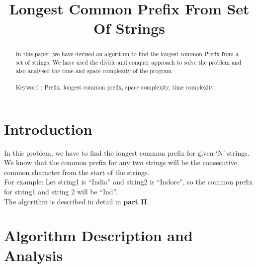 \documentclass[conference]{IEEEtran}
\begin{document}
\title{
Longest Common Prefix From Set Of Strings\\
}

\author{
\and
{}
\and
{}
}

\maketitle

\noindent \begin{abstract}

In this paper ,we have devised an algorithm to find the longest common Prefix from a set of strings. We have used the divide and conquer approach to solve the problem and also analysed the time and space complexity of the program.\\\\
Keyword : Prefix, longest common prefix, space complexity, time complexity.

\end{abstract}


\section{\textbf{Introduction}}
\noindent In this problem, we have to find the longest common prefix for given ‘N’ strings. \\

\noindent We know that the common prefix for any two strings will be the  consecutive common character from the start of the strings.\\

\noindent For example: Let string1 is “India” and string2 is “Indore”, so the common prefix for string1 and string 2 will be “Ind”.\\

\noindent The algorithm  is described in detail in \textbf{part II}.\\


\section{\textbf {Algorithm Description and Analysis}}
\end{document}
